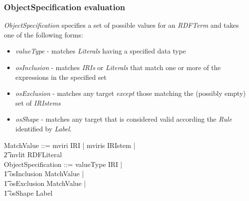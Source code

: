 \documentclass[fuzz]{llncs}
\def\zc{\textit}
\begin{document}
\subsubsection{ObjectSpecification evaluation}
\zc{ObjectSpecification} specifies a set of possible values for an \zc{RDFTerm} and takes one of the following forms:
\begin{itemize}
\item \zc{valueType} - matches \zc{Literals} having a specified data type
\item \zc{osInclusion} - matches \zc{IRIs} or \zc{Literals} that match one or more of the expressions in the specified set
\item \zc{osExclusion} - matches any target \emph{except} those matching the (possibly empty) set of \zc{IRIstems}
\item \zc{osShape} - matches any target that is considered valid according the \zc{Rule} identified by \zc{Label}.
\end{itemize}
\begin{zed}
MatchValue ::= mviri \ldata IRI \rdata | mviris \ldata IRIstem \rdata | \\
\t2 mvlit \ldata RDFLiteral \rdata \\
ObjectSpecification ::= valueType \ldata IRI \rdata | \\
\t1 osInclusion \ldata \power MatchValue \rdata | \\
\t1 osExclusion \ldata \power MatchValue \rdata | \\
\t1 osShape \ldata Label \rdata
\end{zed}
\end{document}
